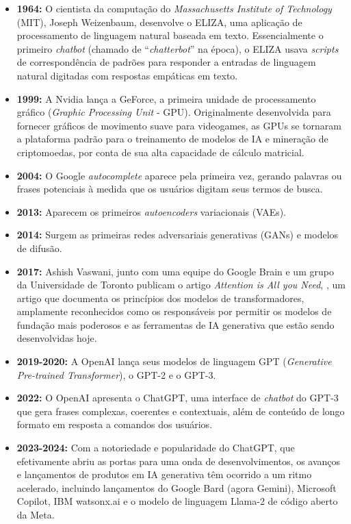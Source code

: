 \documentclass[a4paper, 12pt]{article}
\newcommand{\citeb}[1]{\bibleftbracket\cite{#1}\bibrightbracket}
\begin{document}
    \begin{itemize}
        \item \textbf{1964:} O cientista da computação do \textit{Massachusetts Institute of Technology} (MIT), Joseph Weizenbaum, desenvolve o ELIZA, uma aplicação de processamento de linguagem natural baseada em texto. Essencialmente o primeiro \textit{chatbot} (chamado de ``\textit{chatterbot}'' na época), o ELIZA usava \textit{scripts} de correspondência de padrões para responder a entradas de linguagem natural digitadas com respostas empáticas em texto.

        \item \textbf{1999:} A Nvidia lança a GeForce, a primeira unidade de processamento gráfico (\textit{Graphic Processing Unit} - GPU). Originalmente desenvolvida para fornecer gráficos de movimento suave para videogames, as GPUs se tornaram a plataforma padrão para o treinamento de modelos de IA e mineração de criptomoedas, por conta de sua alta capacidade de cálculo matricial.

        \item \textbf{2004:} O Google \textit{autocomplete} aparece pela primeira vez, gerando palavras ou frases potenciais à medida que os usuários digitam seus termos de busca.

        \item \textbf{2013:} Aparecem os primeiros \textit{autoencoders} variacionais (VAEs).

        \item \textbf{2014:} Surgem as primeiras redes adversariais generativas (GANs) e modelos de difusão.

        \item \textbf{2017:} Ashish Vaswani, junto com uma equipe do Google Brain e um grupo da Universidade de Toronto publicam o artigo \textit{Attention is All you Need}, \citeb{att_all_u_need}, um artigo que documenta os princípios dos modelos de transformadores, amplamente reconhecidos como os responsáveis por permitir os modelos de fundação mais poderosos e as ferramentas de IA generativa que estão sendo desenvolvidas hoje.

        \item \textbf{2019-2020:} A OpenAI lança seus modelos de linguagem GPT (\textit{Generative Pre-trained Transformer}), o GPT-2 e o GPT-3.
    
        \item \textbf{2022:} O OpenAI apresenta o ChatGPT, uma interface de \textit{chatbot} do GPT-3 que gera frases complexas, coerentes e contextuais, além de conteúdo de longo formato em resposta a comandos dos usuários.
        
        \item \textbf{2023-2024:} Com a notoriedade e popularidade do ChatGPT, que efetivamente abriu as portas para uma onda de desenvolvimentos, os avanços e lançamentos de produtos em IA generativa têm ocorrido a um ritmo acelerado, incluindo lançamentos do Google Bard (agora Gemini), Microsoft Copilot, IBM watsonx.ai e o modelo de linguagem Llama-2 de código aberto da Meta.
    \end{itemize}
\end{document}
